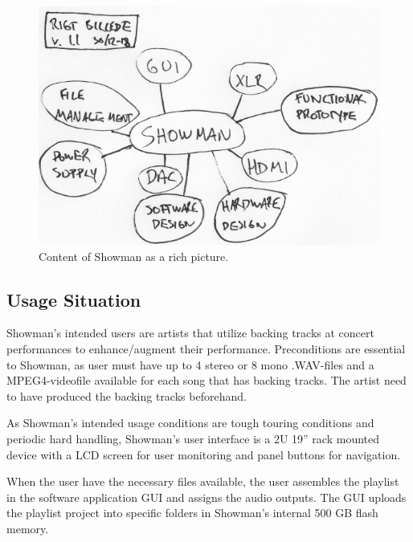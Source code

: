 \begin{figure}[htb!]
\centering
\includegraphics[scale=1]{./pictures/RigtBillede.png}
\caption{Content of Showman as a rich picture.}
\label{fig:RigtBillede.png}
\end{figure}


\subsection{Usage Situation} 

Showman's intended users are artists that utilize backing tracks at concert performances to enhance/augment their performance. Preconditions are essential to Showman, as user must have up to 4 stereo or 8 mono .WAV-files and a MPEG4-videofile available for each song that has backing tracks. The artist need to have produced the backing tracks beforehand. \newline

As Showman's intended usage conditions are tough touring conditions and periodic hard handling, Showman's user interface is a 2U 19'' rack mounted device with a LCD screen for user monitoring and panel buttons for navigation.   \newline

When the user have the necessary files available, the user assembles the playlist in the software application GUI and assigns the audio outputs. The GUI uploads the playlist project into specific folders in Showman's internal 500 GB flash memory. \newline

